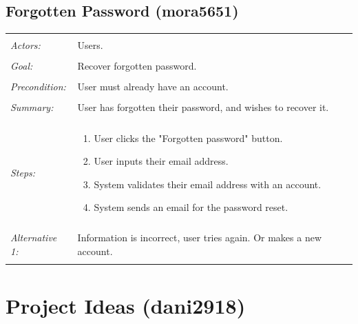 \documentclass[11pt]{report}
\begin{document}
\subsection{Forgotten Password (mora5651)}
\begin{tabular}{ p{2cm} p{12cm} }
 \hline
 \\
 \textit{Actors:} & Users. \\ 
  \\
 \textit{Goal:} & Recover forgotten password. \\ 
 \\
 \textit{Precondition:} & User must already have an account. \\
 \\
 \textit{Summary:}  & User has forgotten their password, and wishes to recover it. \\
 \\
 \textit{Steps:} & \begin{enumerate}
 \item User clicks the "Forgotten password" button. 
 \item User inputs their email address. 
 \item System validates their email address with an account. 
 \item System sends an email for the password reset. 
 \end{enumerate} \\
\\
  \textit{Alternative 1:} & Information is incorrect, user tries again. Or makes a new account. \\
\\
\hline
\end{tabular}

\section{Project Ideas (dani2918)}
\end{document}
